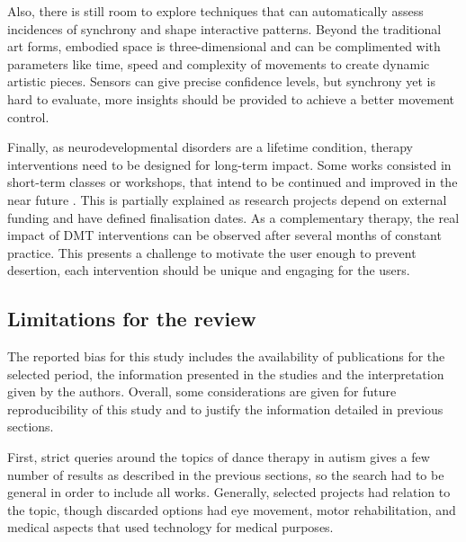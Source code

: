 \documentclass[a4paper,fleqn]{cas-sc}
\begin{document}
Also, there is still room to explore techniques that can automatically assess incidences of synchrony and shape interactive patterns. Beyond the traditional art forms, embodied space is three-dimensional and can be complimented with parameters like time, speed and complexity of movements to create dynamic artistic pieces. Sensors can give precise confidence levels, but synchrony yet is hard to evaluate, more insights should be provided to achieve a better movement control.

Finally, as neurodevelopmental disorders are a lifetime condition, therapy interventions need to be designed for long-term impact. Some works consisted in short-term classes or workshops, that intend to be continued and improved in the near future \cite{Caro18, Krichmar2018, Vargas20, Ragone22}. This is partially explained as research projects depend on external funding and have defined finalisation dates. As a complementary therapy, the real impact of DMT interventions can be observed after several months of constant practice. This presents a challenge to motivate the user enough to prevent desertion, each intervention should be unique and engaging for the users.



\subsection{Limitations for the review}
The reported bias for this study includes the availability of publications for the selected period, the information presented in the studies and the interpretation given by the authors. Overall, some considerations are given for future reproducibility of this study and to justify the information detailed in previous sections.

First, strict queries around the topics of dance therapy in autism gives a few number of results as described in the previous sections, so the search had to be general in order to include all works. Generally, selected projects had relation to the topic, though discarded options had eye movement, motor rehabilitation, and medical aspects that used technology for medical purposes.
\end{document}
